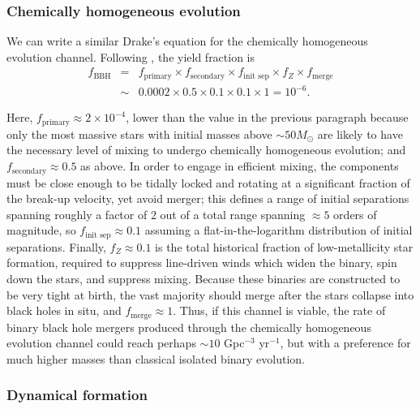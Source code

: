 \documentclass[iop,onecolumn]{revtex4}
\begin{document}
\subsubsection{Chemically homogeneous evolution}

We can write a similar Drake's equation for the chemically homogeneous evolution channel.  Following \citet{MandeldeMink:2016},  the yield fraction is
\begin{eqnarray}
f_\textrm{BBH} &=& f_\textrm{primary} \times f_\textrm{secondary} \times f_\textrm{init sep} \times f_Z \times f_\textrm{merge} \nonumber \\
 & \sim & 0.0002 \times 0.5 \times 0.1 \times 0.1 \times 1 = 10^{-6}.
\end{eqnarray}

Here, $f_\textrm{primary} \approx 2 \times 10^{-4}$, lower than the value in the previous paragraph because only the most massive stars with initial masses above $\sim 50 M_\odot$ are likely to have the necessary level of mixing to undergo chemically homogeneous evolution; and $f_\textrm{secondary} \approx 0.5$ as above.  In order to engage in efficient mixing, the components must be close enough to be tidally locked and rotating at a significant fraction of the break-up velocity, yet avoid merger; this defines a range of initial separations spanning roughly a factor of 2 out of a total range spanning $\approx 5$ orders of magnitude, so $f_\textrm{init sep} \approx 0.1$ assuming a flat-in-the-logarithm distribution of initial separations.  Finally, $f_Z \approx 0.1$ is the total historical fraction of low-metallicity star formation, required to suppress line-driven winds which widen the binary, spin down the stars, and suppress mixing.  Because these binaries are constructed to be very tight at birth, the vast majority should merge after the stars collapse into black holes in situ, and $f_\textrm{merge} \approx 1$. Thus, if this channel is viable, the rate of binary black hole mergers produced through the chemically homogeneous evolution channel could reach perhaps $\sim 10$ Gpc$^{-3}$ yr$^{-1}$, but with a preference for much higher masses than classical isolated binary evolution.


\subsubsection{Dynamical formation}
\end{document}
